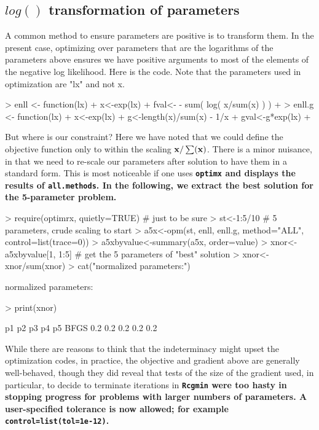 \documentclass[11pt]{article}
\newcommand{\B}[1]{{\bf #1 \rm}}
\newcommand{\code}[1]{{\tt#1}}
\newcommand{\pkg}[1]{\bf{\tt#1}\rm }
\begin{document}
\subsection{$log()$ transformation of parameters}

A common method to ensure parameters are positive is to transform 
them. In the present case, optimizing over
parameters that are the logarithms of the parameters above 
ensures we have positive arguments to most of the
elements of the negative log likelihood. Here is the code. 
Note that the parameters used in optimization
are "lx" and not x.

\begin{Schunk}
\begin{Sinput}
> enll <- function(lx) {
+     x<-exp(lx)
+     fval<-  - sum( log( x/sum(x) ) ) 
+ }
> enll.g <- function(lx){
+     x<-exp(lx)
+     g<-length(x)/sum(x) - 1/x
+     gval<-g*exp(lx)
+ }
\end{Sinput}
\end{Schunk}

But where is our constraint? Here we have noted that we could define the objective 
function only to within the scaling  $\B{x}/\sum(\B{x})$. There is a minor 
nuisance, in that we need to re-scale our 
parameters after solution to have them in a standard form. 
This is most noticeable if one uses \pkg{optimx}
and displays the results of \code{all.methods}. In the following, we
extract the best solution for the 5-parameter problem.

\begin{Schunk}
\begin{Sinput}
> require(optimrx, quietly=TRUE) # just to be sure
> st<-1:5/10 # 5 parameters, crude scaling to start
> a5x<-opm(st, enll, enll.g, method="ALL", control=list(trace=0))
> a5xbyvalue<-summary(a5x, order=value)
> xnor<-a5xbyvalue[1, 1:5] # get the 5 parameters of "best" solution
> xnor<-xnor/sum(xnor)
> cat("normalized parameters:")
\end{Sinput}
\begin{Soutput}
normalized parameters:
\end{Soutput}
\begin{Sinput}
> print(xnor)
\end{Sinput}
\begin{Soutput}
      p1  p2  p3  p4  p5
BFGS 0.2 0.2 0.2 0.2 0.2
\end{Soutput}
\end{Schunk}


While there are reasons to think that the indeterminacy
might upset the optimization codes, in practice, the objective 
and gradient above are generally
well-behaved, though they did reveal that tests of the size 
of the gradient used, in particular, to
decide to terminate iterations in \pkg{Rcgmin} were too 
hasty in stopping progress for problems
with larger numbers of parameters. A user-specified tolerance is now allowed; for
example \code{control=list(tol=1e-12)}. 
\end{document}
